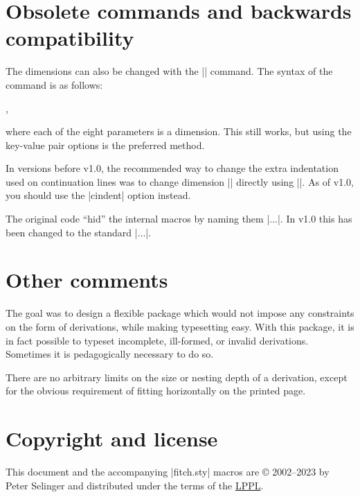 \documentclass{ltxdoc}
\newcommand\NewIn[1]{\leavevmode
  \marginpar{\hfill\fbox{\fbox{New in #1}}\hspace*{1em}}\ignorespaces}
\begin{document}
\section{Obsolete commands and backwards compatibility}

\DescribeMacro{\nddim}
The dimensions can also be changed with the
|\nddim| command. The syntax of the command is as follows:
\begin{center}
  \cmd{\nddim}
  ,
\end{center}
where each of the eight parameters is a dimension. This still works,
but using the key-value pair options is the preferred method.

\NewIn{1.0}\DescribeMacro{\ndindent} In versions before v1.0, the recommended way
to change the extra indentation used on continuation lines was to
change dimension |\ndindent| directly using |\setlength|. As of v1.0,
you should use the |cindent| option instead.

The original code ``hid'' the internal macros by naming
them |\nd*...|. In v1.0 this has been changed to the standard
|\nd@...|.

\section{Other comments}

The goal was to design a flexible package which would not impose any
constraints on the form of derivations, while making typesetting easy.
With this package, it is in fact possible to typeset incomplete,
ill-formed, or invalid derivations. Sometimes it is pedagogically necessary
to do so.

There are no arbitrary limits on the size or nesting depth of a derivation,
except for the obvious requirement of fitting horizontally on the
printed page.

\section{Copyright and license}

This document and the accompanying |fitch.sty| macros
are {\copyright} 2002--2023 by Peter Selinger and distributed under
the terms of the \href{https://www.latex-project.org/lppl/}{LPPL}.
\end{document}
